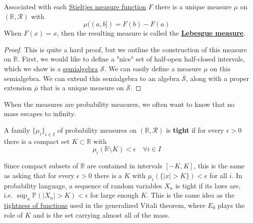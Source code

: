   \begin{theorem}
    \label{thm:lebesgue-stieltjes-measures}
    Associated with each \hyperref[ex:stieltjes-measure-function]{Stieltjes measure function} $F$ there is a unique measure $\mu$ on $(\mathbb{R}, \mathcal{R})$ with 
    \begin{equation}
      \mu((a, b]) = F(b) - F(a)
    \end{equation}
    When $F(x) = x$, then the resulting measure is called the \textbf{\hyperref[def:lebesgue-measure]{Lebesgue measure}}. 
  \end{theorem}
	\begin{proof}
		This is quite a hard proof, but we outline the construction of this measure on $\mathbb{R}$. First, we would like to define a "nice" set of half-open half-closed intervals, which we show is a \hyperref[def:semialgebra]{semialgebra} $\mathcal{S}$. We can easily define a measure $\mu$ on this semialgebra. We can extend this semialgebra to an algebra $\overline{\mathcal{S}}$, along with a proper extension $\overline{\mu}$ that is a unique measure on $\overline{\mathcal{S}}$. 
	\end{proof}

  When the measures are probability measures, we often want to know that no mass escapes to infinity. 

  \begin{definition}
    \label{def:tight-family-of-measures}
    A family $\{\mu_i\}_{i \in I}$ of probability measures on $(\mathbb{R}, \mathcal{R})$ is \textbf{tight} if for every $\epsilon > 0$ there is a compact set $K \subset \mathbb{R}$ with 
    \begin{equation}
      \mu_i (\mathbb{R} \setminus K) < \epsilon \quad \forall i \in I
    \end{equation}
  \end{definition}

  Since compact subsets of $\mathbb{R}$ are contained in intervals $[-K, K]$, this is the same as asking that for every $\epsilon > 0$ there is a $K$ with $\mu_i(\{|x| > K\}) < \epsilon$ for all $i$. In probability language, a sequence of random variables $X_n$ is tight if its laws are, i.e. $\sup_n \mathbb{P}(|X_n| > K) < \epsilon$ for large enough $K$. This is the same idea as the \hyperref[def:tight]{tightness of functions} used in the generalized Vitali theorem, where $E_0$ plays the role of $K$ and is the set carrying almost all of the mass. 


